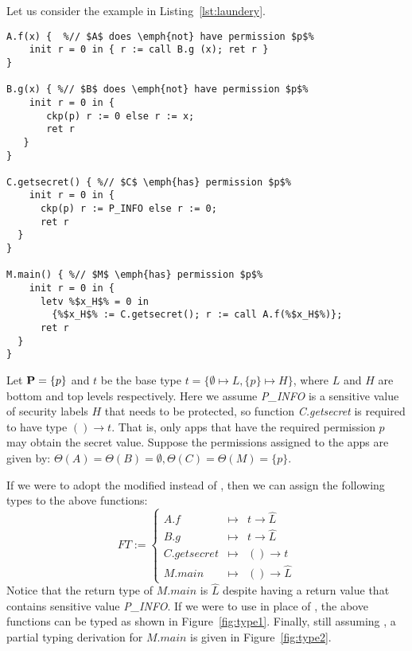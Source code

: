 {{{Let us consider the example in Listing~\ref{lst:laundery}.
\begin{lstlisting}[float=tp, label={lst:laundery}, caption={An example illustrating the parameter laundering issue.}]
A.f(x) {  %// $A$ does \emph{not} have permission $p$%
	init r = 0 in { r := call B.g (x); ret r }
}
	
B.g(x) { %// $B$ does \emph{not} have permission $p$%
	init r = 0 in {
	   ckp(p) r := 0 else r := x;
	   ret r 
   }
}

C.getsecret() { %// $C$ \emph{has} permission $p$%
	init r = 0 in {
	  ckp(p) r := P_INFO else r := 0;
	  ret r 
  }
}

M.main() { %// $M$ \emph{has} permission $p$%
    init r = 0 in {
	  letv %$x_H$% = 0 in
	  	{%$x_H$% := C.getsecret(); r := call A.f(%$x_H$%)};
      ret r
  }
}
\end{lstlisting}
Let $\mathbf{P}=\{p\}$ and $t$ be the base type $t =  \{\emptyset \mapsto L, \{p\} \mapsto H\}$,
where $L$ and $H$ are bottom and top levels respectively. Here we assume \textit{P\_INFO} is a sensitive value
of security labels $H$ that needs to be protected, so function \textit{C.getsecret} is required to have type $() \rightarrow t$. That is, only apps that have the required permission $p$ may obtain
the secret value.
Suppose the permissions assigned to the apps are given by:  $\Theta(A) =  \Theta(B) = \emptyset, \Theta(C) = \Theta(M) = \{p\}.$

If we were to adopt the modified  instead of , then we can assign the following
types to the above functions:
{\myeqsize\begin{equation*}
FT := \left\{
\begin{array}{lcl}
A.f & \mapsto & t \rightarrow \hat{L} \\
B.g & \mapsto & t \rightarrow \hat{L}\\
C.getsecret & \mapsto & () \rightarrow t\\
M.main & \mapsto  & () \rightarrow \hat{L}
\end{array}
\right.	
\end{equation*}}
Notice that the return type of $M.main$ is $\hat{L}$ despite having a
return value that contains sensitive value \textit{P\_INFO}.
If we were to use  in place of , the above functions can
be typed as shown in Figure~\ref{fig:type1}.
Finally, still assuming , a partial typing
derivation for $M.main$ is given in Figure~\ref{fig:type2}.

}}}
